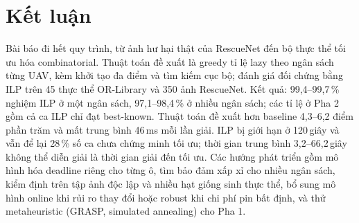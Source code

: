 \documentclass[conference]{IEEEtran}
\begin{document}
\section{Kết luận}
\label{sec:conclusion}
Bài báo đi hết quy trình, từ ảnh hư hại thật của RescueNet đến bộ thực thể tối ưu hóa
combinatorial. Thuật toán đề xuất là greedy tỉ lệ lazy theo ngân sách từng UAV, kèm khởi tạo đa điểm và
tìm kiếm cục bộ; đánh giá đối chứng bằng ILP trên 45 thực thể OR-Library và 350 ảnh
RescueNet. Kết quả: 99,4--99,7\,\% nghiệm ILP ở một ngân sách, 97,1--98,4\,\% ở nhiều ngân
sách; các tỉ lệ ở Pha 2 gồm cả ca ILP chỉ đạt best-known. Thuật toán đề xuất hơn baseline
4,3--6,2 điểm phần trăm và mất trung bình 46\,ms mỗi lần giải. ILP bị giới hạn ở 120\,giây
và vẫn để lại 28\,\% số ca chưa chứng minh tối ưu; thời gian trung bình 3,2--66,2\,giây
không thể diễn giải là thời gian giải đến tối ưu. Các hướng phát triển gồm mô hình hóa
deadline riêng cho từng ô, tìm bảo đảm xấp xỉ cho nhiều ngân sách, kiểm định trên tập ảnh
độc lập và nhiều hạt giống sinh thực thể, bổ sung mô hình online khi rủi ro thay đổi
hoặc robust khi chi phí pin bất định, và thử metaheuristic (GRASP, simulated annealing)
cho Pha 1.
\end{document}
